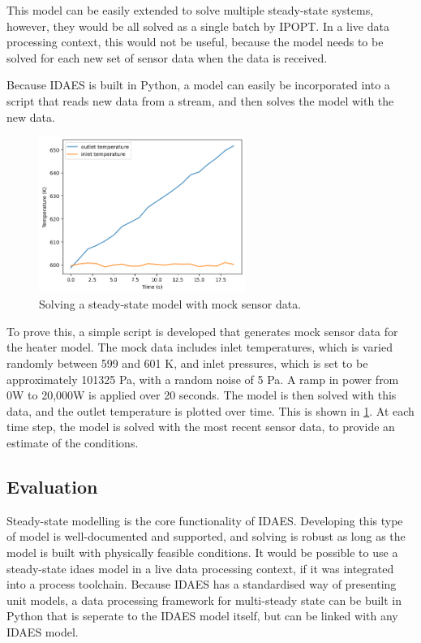 \documentclass[12pt]{article}
\begin{document}
This model can be easily extended to solve multiple steady-state systems, however, they would be all solved as a single batch by IPOPT. In a live data processing context, this would not be useful, because the model needs to be solved for each new set of sensor data when the data is received. 

Because IDAES is built in Python, a model can easily be incorporated into a script that reads new data from a stream, and then solves the model with the new data. 

\begin{figure}
    \centering
    \includegraphics[width=0.6\textwidth]{live_data_processing.png}
    \caption{Solving a steady-state model with mock sensor data.}
    \label{fig:live_mss}
\end{figure}

To prove this, a simple script is developed that generates mock sensor data for the heater model. The mock data includes inlet temperatures, which is varied randomly between 599 and 601 K, and inlet pressures, which is set to be approximately 101325 Pa, with a random noise of 5 Pa. A ramp in power from 0W to 20,000W is applied over 20 seconds. The model is then solved with this data, and the outlet temperature is plotted over time. This is shown in \cref{fig:live_mss}. At each time step, the model is solved with the most recent sensor data, to provide an estimate of the conditions.


\subsection{Evaluation}


Steady-state modelling is the core functionality of IDAES. Developing this type of model is well-documented and supported, and solving is robust as long as the model is built with physically feasible conditions.
It would be possible to use a steady-state idaes model in a live data processing context, if it was integrated into a process toolchain. Because IDAES has a standardised way of presenting unit models, a data processing framework for multi-steady state can be built in Python that is seperate to the IDAES model itself, but can be linked with any IDAES model.
\end{document}
